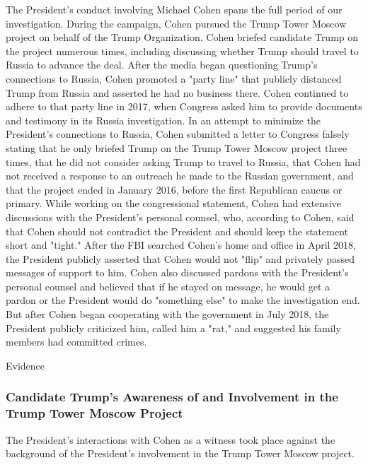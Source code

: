 {The President's conduct involving Michael Cohen spans the full period of our investigation.
During the campaign, Cohen pursued the Trump Tower Moscow project on behalf of the Trump Organization.
Cohen briefed candidate Trump on the project numerous times, including discussing whether Trump should travel to Russia to advance the deal.
After the media began questioning Trump's connections to Russia, Cohen promoted a "party line" that publicly distanced Trump from Russia and asserted he had no business there.
Cohen continued to adhere to that party line in 2017, when Congress asked him to provide documents and testimony in its Russia investigation.
In an attempt to minimize the President's connections to Russia, Cohen submitted a letter to Congress falsely stating that he only briefed Trump on the Trump Tower Moscow project three times, that he did not consider asking Trump to travel to Russia, that Cohen had not received a response to an outreach he made to the Russian government, and that the project ended in January 2016, before the first Republican caucus or primary.
While working on the congressional statement, Cohen had extensive discussions with the President's personal counsel, who, according to Cohen, said that Cohen should not contradict the President and should keep the statement short and "tight."
After the FBI searched Cohen's home and office in April 2018, the President publicly asserted that Cohen would not "flip" and privately passed messages of support to him.
Cohen also discussed pardons with the President's personal counsel and believed that if he stayed on message, he would get a pardon or the President would do "something else" to make the investigation end.
But after Cohen began cooperating with the government in July 2018, the President publicly criticized him, called him a "rat," and suggested his family members had committed crimes.

Evidence

\subsubsection{Candidate Trump's Awareness of and Involvement in the Trump Tower Moscow Project}

The President's interactions with Cohen as a witness took place against the background of the President's involvement in the Trump Tower Moscow project.

}
